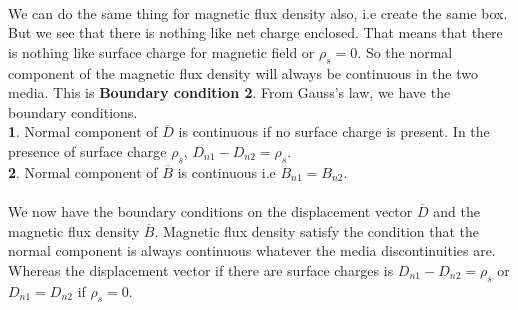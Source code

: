 	\paragraph{} We can do the same thing for magnetic flux density also, i.e create the same box. But we see that there is nothing like net charge enclosed. That means that there is nothing like surface charge for magnetic field or $\rho_s = 0$. So the normal component of the magnetic flux density will always be continuous in the two media. This is \textbf{Boundary condition 2}. From Gauss's law, we have the boundary conditions.\\
	\textbf{1}. Normal component of $\overline{D}$ is continuous if no surface charge is present. In the presence of surface charge $\rho_s$, $D_{n1}- D_{n2} = \rho_s$.\\
	\textbf{2}. Normal component of $\overline{B}$ is continuous i.e $B_{n1} = B_{n2}$.\\ \\
	We now have the boundary conditions on the displacement vector $\overline{D}$ and the magnetic flux density $\overline{B}$. Magnetic flux density satisfy the condition that the normal component is always continuous whatever the media discontinuities are. Whereas the displacement vector if there are surface charges  is $D_{n1}- D_{n2} = \rho_s$ or $D_{n1} = D_{n2} $ if $\rho_s = 0$. 
